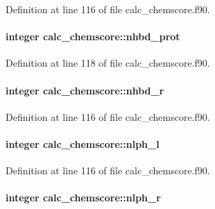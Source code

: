 Definition at line 116 of file calc\-\_\-chemscore.\-f90.

\hypertarget{classcalc__chemscore_a03c8c74285e823b77a4b9342b74063ef}{
\paragraph[{nhbd\-\_\-prot}]{\setlength{\rightskip}{0pt plus 5cm}integer calc\-\_\-chemscore\-::nhbd\-\_\-prot}}\label{classcalc__chemscore_a03c8c74285e823b77a4b9342b74063ef}


Definition at line 118 of file calc\-\_\-chemscore.\-f90.

\hypertarget{classcalc__chemscore_a5bffc5652f8ffe498565f481d234250d}{
\paragraph[{nhbd\-\_\-r}]{\setlength{\rightskip}{0pt plus 5cm}integer calc\-\_\-chemscore\-::nhbd\-\_\-r}}\label{classcalc__chemscore_a5bffc5652f8ffe498565f481d234250d}


Definition at line 116 of file calc\-\_\-chemscore.\-f90.

\hypertarget{classcalc__chemscore_a4eec2bd11c50bf788ae8928ba575fbef}{
\paragraph[{nlph\-\_\-l}]{\setlength{\rightskip}{0pt plus 5cm}integer calc\-\_\-chemscore\-::nlph\-\_\-l}}\label{classcalc__chemscore_a4eec2bd11c50bf788ae8928ba575fbef}


Definition at line 116 of file calc\-\_\-chemscore.\-f90.

\hypertarget{classcalc__chemscore_a398cedd02c40d7f982a22ccc167e29f0}{
\paragraph[{nlph\-\_\-r}]{\setlength{\rightskip}{0pt plus 5cm}integer calc\-\_\-chemscore\-::nlph\-\_\-r}}\label{classcalc__chemscore_a398cedd02c40d7f982a22ccc167e29f0}


